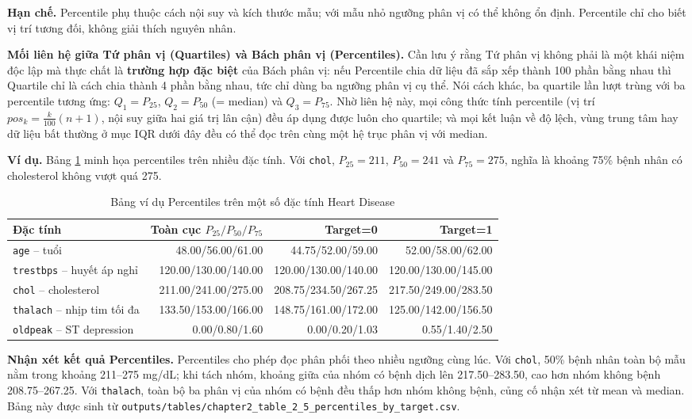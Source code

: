 \textbf{Hạn chế.} Percentile phụ thuộc cách nội suy và kích thước mẫu; với mẫu nhỏ ngưỡng phân vị có thể không ổn định. Percentile chỉ cho biết vị trí tương đối, không giải thích nguyên nhân.

\textbf{Mối liên hệ giữa Tứ phân vị (Quartiles) và Bách phân vị (Percentiles).} Cần lưu ý rằng Tứ phân vị không phải là một khái niệm độc lập mà thực chất là \textbf{trường hợp đặc biệt} của Bách phân vị: nếu Percentile chia dữ liệu đã sắp xếp thành 100 phần bằng nhau thì Quartile chỉ là cách chia thành 4 phần bằng nhau, tức chỉ dùng ba ngưỡng phân vị cụ thể. Nói cách khác, ba quartile lần lượt trùng với ba percentile tương ứng: $Q_1=P_{25}$, $Q_2=P_{50}$ (= median) và $Q_3=P_{75}$. Nhờ liên hệ này, mọi công thức tính percentile (vị trí $pos_k=\tfrac{k}{100}(n+1)$, nội suy giữa hai giá trị lân cận) đều áp dụng được luôn cho quartile; và mọi kết luận về độ lệch, vùng trung tâm hay dữ liệu bất thường ở mục IQR dưới đây đều có thể đọc trên cùng một hệ trục phân vị với median.

\textbf{Ví dụ.} Bảng \ref{tab:chapter1_percentile_example} minh họa percentiles trên nhiều đặc tính. Với \texttt{chol}, $P_{25}=211$, $P_{50}=241$ và $P_{75}=275$, nghĩa là khoảng 75\% bệnh nhân có cholesterol không vượt quá 275.

\begin{table}[H]
\centering
\caption{Bảng ví dụ Percentiles trên một số đặc tính Heart Disease}
\label{tab:chapter1_percentile_example}
\small
\begin{tabular}{lrrr}
\toprule
Đặc tính & Toàn cục $P_{25}/P_{50}/P_{75}$ & Target=0 & Target=1 \\
\midrule
\texttt{age} -- tuổi & 48.00/56.00/61.00 & 44.75/52.00/59.00 & 52.00/58.00/62.00 \\
\texttt{trestbps} -- huyết áp nghỉ & 120.00/130.00/140.00 & 120.00/130.00/140.00 & 120.00/130.00/145.00 \\
\texttt{chol} -- cholesterol & 211.00/241.00/275.00 & 208.75/234.50/267.25 & 217.50/249.00/283.50 \\
\texttt{thalach} -- nhịp tim tối đa & 133.50/153.00/166.00 & 148.75/161.00/172.00 & 125.00/142.00/156.50 \\
\texttt{oldpeak} -- ST depression & 0.00/0.80/1.60 & 0.00/0.20/1.03 & 0.55/1.40/2.50 \\
\bottomrule
\end{tabular}
\end{table}

\textbf{Nhận xét kết quả Percentiles.} Percentiles cho phép đọc phân phối theo nhiều ngưỡng cùng lúc. Với \texttt{chol}, 50\% bệnh nhân toàn bộ mẫu nằm trong khoảng 211--275 mg/dL; khi tách nhóm, khoảng giữa của nhóm có bệnh dịch lên 217.50--283.50, cao hơn nhóm không bệnh 208.75--267.25. Với \texttt{thalach}, toàn bộ ba phân vị của nhóm có bệnh đều thấp hơn nhóm không bệnh, củng cố nhận xét từ mean và median. Bảng này được sinh từ \texttt{outputs/tables/chapter2\_table\_2\_5\_percentiles\_by\_target.csv}.

